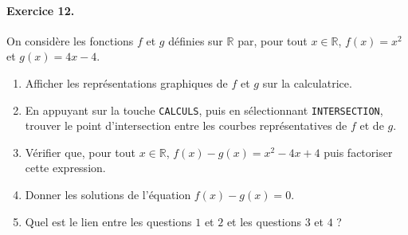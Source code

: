 \documentclass[11pt]{article}
\begin{document}
\paragraph{Exercice 12.}
On considère les fonctions $f$ et $g$ définies sur $\mathbb{R}$ par, pour tout
$x\in\mathbb{R}$, $f(x)=x^2$ et $g(x) = 4x-4$.
\begin{enumerate}
  \item Afficher les représentations graphiques de $f$ et $g$ sur la
    calculatrice.
  \item En appuyant sur la touche \texttt{CALCULS}, puis en sélectionnant
    \texttt{INTERSECTION}, trouver le point d'intersection entre les courbes
    représentatives de $f$ et de $g$.
  \item Vérifier que, pour tout $x\in\mathbb{R}$, $f(x)-g(x)=x^2-4x+4$ puis
    factoriser cette expression.
  \item Donner les solutions de l'équation $f(x)-g(x)=0$.
  \item Quel est le lien entre les questions $1$ et $2$ et les questions $3$ et
    $4$ ?
\end{enumerate}
\end{document}
